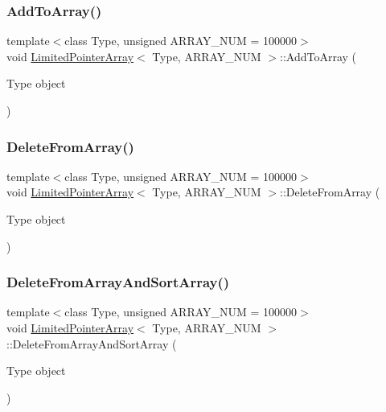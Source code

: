 \subsubsection{\texorpdfstring{Add\+To\+Array()}{AddToArray()}}
{\footnotesize\ttfamily template$<$class Type, unsigned A\+R\+R\+A\+Y\+\_\+\+N\+UM = 100000$>$ \\
void \mbox{\hyperlink{class_limited_pointer_array}{Limited\+Pointer\+Array}}$<$ Type, A\+R\+R\+A\+Y\+\_\+\+N\+UM $>$\+::Add\+To\+Array (\begin{DoxyParamCaption}\item[{Type}]{object }\end{DoxyParamCaption})\hspace{0.3cm}{\ttfamily [inline]}}

\mbox{\label{class_limited_pointer_array_a02cfaed541d27980883ec9eb90ad3813}} 
\subsubsection{\texorpdfstring{Delete\+From\+Array()}{DeleteFromArray()}}
{\footnotesize\ttfamily template$<$class Type, unsigned A\+R\+R\+A\+Y\+\_\+\+N\+UM = 100000$>$ \\
void \mbox{\hyperlink{class_limited_pointer_array}{Limited\+Pointer\+Array}}$<$ Type, A\+R\+R\+A\+Y\+\_\+\+N\+UM $>$\+::Delete\+From\+Array (\begin{DoxyParamCaption}\item[{Type}]{object }\end{DoxyParamCaption})\hspace{0.3cm}{\ttfamily [inline]}}

\mbox{\label{class_limited_pointer_array_a32dd58543bee490df6dcea079ebe4586}} 
\subsubsection{\texorpdfstring{Delete\+From\+Array\+And\+Sort\+Array()}{DeleteFromArrayAndSortArray()}}
{\footnotesize\ttfamily template$<$class Type, unsigned A\+R\+R\+A\+Y\+\_\+\+N\+UM = 100000$>$ \\
void \mbox{\hyperlink{class_limited_pointer_array}{Limited\+Pointer\+Array}}$<$ Type, A\+R\+R\+A\+Y\+\_\+\+N\+UM $>$\+::Delete\+From\+Array\+And\+Sort\+Array (\begin{DoxyParamCaption}\item[{Type}]{object }\end{DoxyParamCaption})\hspace{0.3cm}{\ttfamily [inline]}}


